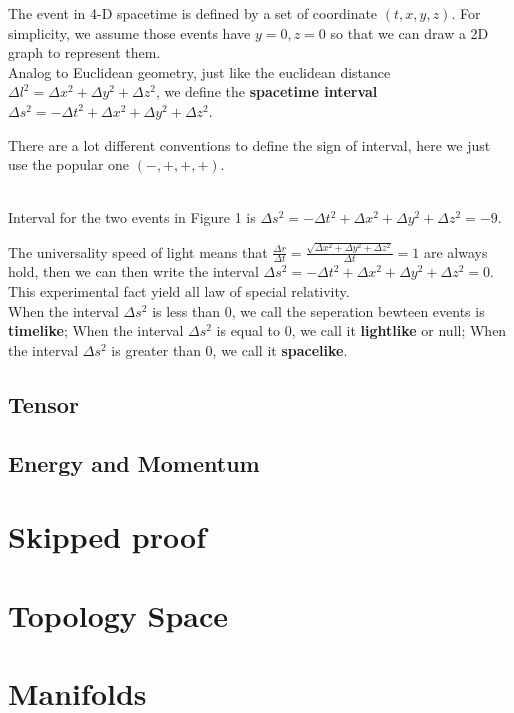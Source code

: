 \documentclass[12pt]{article}
\theoremstyle{mystyle}{\newtheorem{definition}{Definition}[section]}
\theoremstyle{mystyle}{\newtheorem{theorem}[definition]{Theorem}}
\theoremstyle{mystyle}{\newtheorem*{remark}{Remark}}
\theoremstyle{mystyle}{\newtheorem*{example}{Example}}
\theoremstyle{mystyle}{\newtheorem*{examples}{Examples}}
\theoremstyle{cstyle}{\newtheorem*{cthm}{}}
\begin{document}
The event in 4-D spacetime is defined by a set of coordinate \((t, x, y, z)\). 
For simplicity, we assume those events have $y=0, z=0$ so that we can draw a 2D graph to represent them.\\
Analog to Euclidean geometry, just like the euclidean distance \(\Delta l^2 = \Delta x^2 + \Delta y^2 + \Delta z^2\), we define the 
\textbf{spacetime interval} $\Delta s^2 = - \Delta t^2 + \Delta x^2 + \Delta y^2 + \Delta z^2$.

\begin{remark}\leavevmode
There are a lot different conventions to define the sign of interval, here we just use the popular one \((-,+,+,+)\).
\end{remark}
\begin{example}\leavevmode %
    \\Interval for the two events in Figure 1 is $\Delta s^2 = - \Delta t^2 + \Delta x^2 + \Delta y^2 + \Delta z^2 = -9$.
\end{example}
The universality speed of light means that $\frac{\Delta r}{\Delta t} = \frac{\sqrt{\Delta x^2+ \Delta y^2 + \Delta z^2}}{\Delta t}=1$ are always hold, then we can then write the interval 
$\Delta s^2 = - \Delta t^2 + \Delta x^2 + \Delta y^2 + \Delta z^2 = 0$. This experimental fact yield all law of special relativity.
\\
When the interval $\Delta s^2$ is less than 0, we call the seperation bewteen events is \textbf{timelike}; 
When the interval $\Delta s^2$ is equal to 0, we call it \textbf{lightlike} or null;
When the interval $\Delta s^2$ is greater than 0, we call it \textbf{spacelike}.
\subsection{Tensor}

\subsection{Energy and Momentum}

\section{Skipped proof}

\section{Topology Space}

\section{Manifolds}
\end{document}
